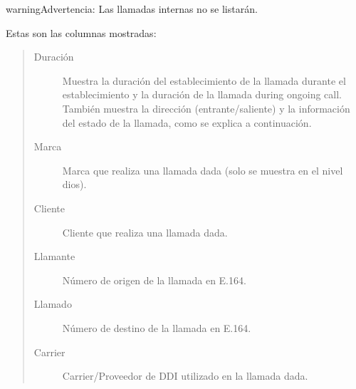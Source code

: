 \documentclass[letterpaper,10pt,spanish]{sphinxmanual}
\begin{document}
\begin{notice}{warning}{Advertencia:}
Las llamadas internas no se listarán.
\end{notice}

Estas son las columnas mostradas:
\begin{quote}
\begin{description}
\item[{Duración}] \leavevmode
Muestra la duración del establecimiento de la llamada durante el establecimiento y la duración de la llamada during ongoing call. También muestra la dirección (entrante/saliente) y la información del estado de la llamada, como se explica a continuación.

\item[{Marca}] \leavevmode
Marca que realiza una llamada dada (solo se muestra en el nivel dios).

\item[{Cliente}] \leavevmode
Cliente que realiza una llamada dada.

\item[{Llamante}] \leavevmode
Número de origen de la llamada en E.164.

\item[{Llamado}] \leavevmode
Número de destino de la llamada en E.164.

\item[{Carrier}] \leavevmode
Carrier/Proveedor de DDI utilizado en la llamada dada.

\end{description}
\end{quote}
\end{document}
